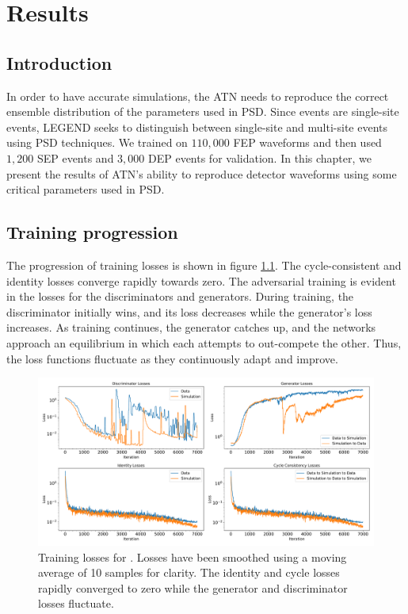 \chapter{{\cpunet} Results}\label{chap:cpu_net_result}

\section{Introduction}
In order to have accurate simulations, the ATN needs to reproduce the correct ensemble distribution of the parameters used in PSD. Since {\onbb} events are single-site events, LEGEND seeks to distinguish between single-site and multi-site events using PSD techniques. We trained {\cpunet} on $110,000$ FEP waveforms and then used $1,200$ SEP events and $3,000$ DEP events for validation. In this chapter, we present the results of ATN's ability to reproduce detector waveforms using some critical parameters used in PSD. 

\section{Training progression}
The progression of training losses is shown in figure \ref{fig:training_loss}. The cycle-consistent and identity losses converge rapidly towards zero. The adversarial training is evident in the losses for the discriminators and generators. During training, the discriminator initially wins, and its loss decreases while the generator's loss increases. As training continues, the generator catches up, and the networks approach an equilibrium in which each attempts to out-compete the other. Thus, the loss functions fluctuate as they continuously adapt and improve.

\begin{figure}%
    \includegraphics[width=\linewidth,trim={0.5cm 0pc 0.5cm 0pc},clip]{ch8/figs/loss_funcs.pdf}
    \caption{Training losses for {\cpunet}. Losses have been smoothed using a moving average of 10 samples for clarity. The identity and cycle losses rapidly converged to zero while the generator and discriminator losses fluctuate.} 
   \label{fig:training_loss}
\end{figure}


